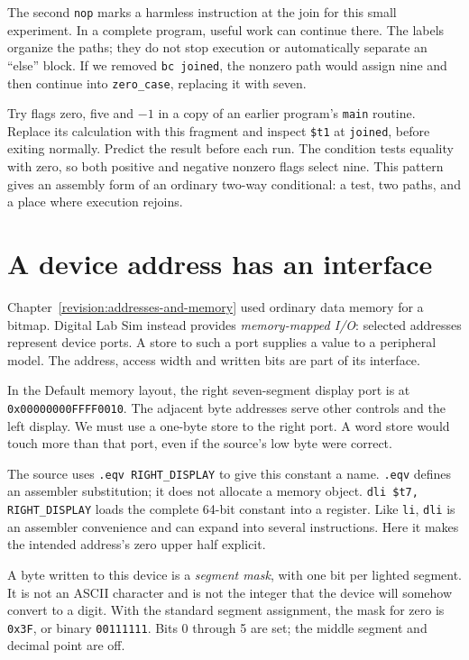 The second \texttt{nop} marks a harmless instruction at the join for this small
experiment. In a complete program, useful work can continue there. The labels
organize the paths; they do not stop execution or automatically separate an
``else'' block. If we removed \texttt{bc joined}, the nonzero path would assign
nine and then continue into \texttt{zero\_case}, replacing it with seven.

Try flags zero, five and $-1$ in a copy of an earlier program's \texttt{main}
routine. Replace its calculation with this fragment and inspect \texttt{\$t1}
at \texttt{joined}, before exiting normally. Predict the result before each run.
The condition tests equality with zero, so both positive and negative nonzero
flags select nine. This pattern gives an assembly form of an ordinary two-way
conditional: a test, two paths, and a place where execution rejoins.

\section{A device address has an interface}

Chapter~\ref{revision:addresses-and-memory} used ordinary data memory for a bitmap.
Digital Lab Sim instead provides \emph{memory-mapped I/O}: selected addresses
represent device ports. A store to such a port supplies a value to a peripheral
model. The address, access width and written bits are part of its interface.

In the Default memory layout, the right seven-segment display port is at
\texttt{0x00000000FFFF0010}. The adjacent byte addresses serve other controls and
the left display. We must use a one-byte store to the right port. A word store
would touch more than that port, even if the source's low byte were correct.

The source uses \texttt{.eqv RIGHT\_DISPLAY} to give this constant a name.
\texttt{.eqv} defines an assembler substitution; it does not allocate a memory
object. \texttt{dli \$t7, RIGHT\_DISPLAY} loads the complete 64-bit constant into
a register. Like \texttt{li}, \texttt{dli} is an assembler convenience and can
expand into several instructions. Here it makes the intended address's zero
upper half explicit.

A byte written to this device is a \emph{segment mask}, with one bit per lighted
segment. It is not an ASCII character and is not the integer that the device will
somehow convert to a digit. With the standard segment assignment, the mask for
zero is \texttt{0x3F}, or binary \texttt{00111111}. Bits 0 through 5 are set;
the middle segment and decimal point are off.


